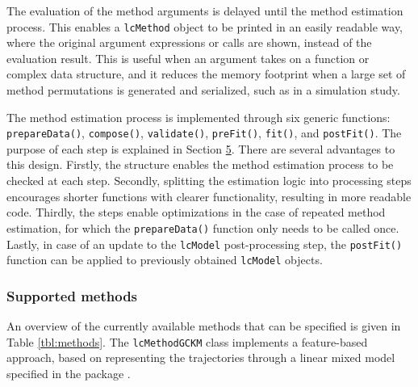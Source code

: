 The evaluation of the method arguments is delayed until the method estimation process. This enables a \texttt{lcMethod} object to be printed in an easily readable way, where the original argument expressions or calls are shown, instead of the evaluation result. This is useful when an argument takes on a function or complex data structure, and it reduces the memory footprint when a large set of method permutations is generated and serialized, such as in a simulation study.

The method estimation process is implemented through six generic functions: \texttt{prepareData()}, \texttt{compose()}, \texttt{validate()}, \texttt{preFit()}, \texttt{fit()}, and \texttt{postFit()}. The purpose of each step is explained in Section \hyperref[sec:extension]{5}. There are several advantages to this design. Firstly, the structure enables the method estimation process to be checked at each step. Secondly, splitting the estimation logic into processing steps encourages shorter functions with clearer functionality, resulting in more readable code. Thirdly, the steps enable optimizations in the case of repeated method estimation, for which the \texttt{prepareData()} function only needs to be called once. Lastly, in case of an update to the \texttt{lcModel} post-processing step, the \texttt{postFit()} function can be applied to previously obtained \texttt{lcModel} objects.

\subsubsection{Supported methods}\label{supported-methods}

An overview of the currently available methods that can be specified is given in Table \ref{tbl:methods}. The \texttt{lcMethodGCKM} class implements a feature-based approach, based on representing the trajectories through a linear mixed model specified in the  package \citep{Bates2015Fitting}.

